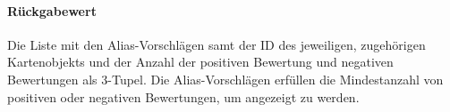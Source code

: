 \paragraph*{Rückgabewert}
Die Liste mit den Alias-Vorschlägen samt der ID des jeweiligen, zugehörigen Kartenobjekts und der Anzahl der positiven Bewertung und negativen Bewertungen als 3-Tupel. 
Die Alias-Vorschlägen erfüllen die Mindestanzahl von positiven oder negativen Bewertungen, um angezeigt zu werden.
